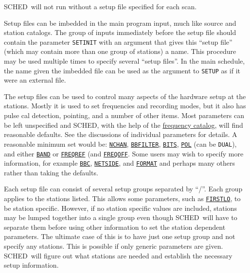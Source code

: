 \documentclass{report}
\newcommand{\sched}{{\sc SCHED}}
\newcommand{\schedb}{{\sc SCHED~}}
\begin{document}
\schedb will not run without a setup file specified for each
scan.

Setup files can be imbedded in the main program input, much like
source and station catalogs.  The group of inputs immediately before
the setup file should contain the parameter {\tt SETINIT} with an
argument that gives this ``setup file'' (which may contain more than
one group of stations) a name.  This procedure may be used multiple
times to specify several ``setup files''.  In the main schedule,
the name given the imbedded file can be used as the argument to
{\tt SETUP} as if it were an external file.

The setup files can be used to control many aspects of the hardware
setup at the stations.  Mostly it is used to set frequencies and
recording modes, but it also has pulse cal detection, pointing, and a
number of other items.  Most parameters can be left unspecified and
\sched, with the help of the 
{\hyperref[SEC:FRQCAT]{frequency catalog}},
will find reasonable defaults.  See the discussions of individual
parameters for details. A reasonable minimum set would be:
{\hyperref[SP:NCHAN]{{\tt NCHAN}}}, 
{\hyperref[SP:BBFILTER]{{\tt BBFILTER}}}, 
{\hyperref[SP:BITS]{{\tt BITS}}}, 
{\hyperref[SP:POL]{{\tt POL}}} (can be {\tt DUAL}), and either 
{\hyperref[SP:BAND]{{\tt BAND}}} or 
{\hyperref[SP:FREQREF]{{\tt FREQREF}}} (and
{\hyperref[SP:FREQOFF]{{\tt FREQOFF}}}.  Some users may wish to specify
more information, for example 
{\hyperref[SP:BBC]{{\tt BBC}}},
{\hyperref[SP:NETSIDE]{{\tt NETSIDE}}}, and 
{\hyperref[SP:FORMAT]{{\tt FORMAT}}}
and perhaps many others rather than taking the defaults.

Each setup file can consist of several setup groups separated by ``/''.
Each group applies to the stations listed.  This allows some parameters,
such as 
{\hyperref[SP:FIRSTLO]{{\tt FIRSTLO}}}, to be station specific.
However, if no station specific values are included, stations may be
lumped together into a single group even though \schedb will have
to separate them before using other information to set the station
dependent parameters.  The ultimate case of this is to have just
one setup group and not specify any stations.  This is possible if
only generic parameters are given.  \schedb will figure out what
stations are needed and establish the necessary setup information.
\end{document}
